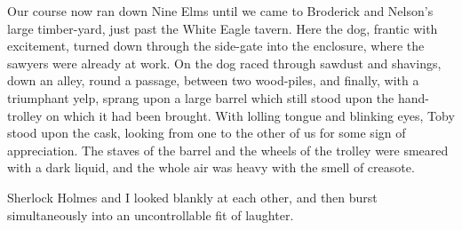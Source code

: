Our course now ran down Nine Elms until we came to Broderick and Nelson's large timber-yard, just past the White Eagle tavern. Here the dog, frantic with excitement, turned down through the side-gate into the enclosure, where the sawyers were already at work. On the dog raced through sawdust and shavings, down an alley, round a passage, between two wood-piles, and finally, with a triumphant yelp, sprang upon a large barrel which still stood upon the hand-trolley on which it had been brought. With lolling tongue and blinking eyes, Toby stood upon the cask, looking from one to the other of us for some sign of appreciation. The staves of the barrel and the wheels of the trolley were smeared with a dark liquid, and the whole air was heavy with the smell of creasote.

Sherlock Holmes and I looked blankly at each other, and then burst simultaneously into an uncontrollable fit of laughter.